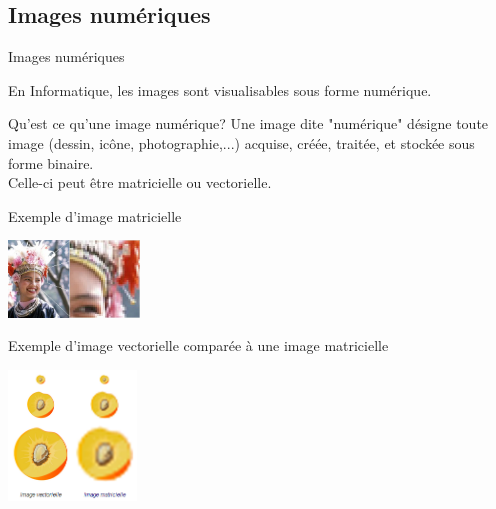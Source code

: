 \documentclass[french]{beamer}
\begin{document}
        \subsection{Images numériques}
            \begin{frame}{Images numériques}
                \tableofcontents[sectionstyle=show/hide,subsectionstyle=show/shaded/hide]
            \end{frame}
            \begin{frame}
                En Informatique, les images sont visualisables sous forme numérique.
                \begin{block}{Qu'est ce qu'une image numérique?}
                        Une image dite "numérique" désigne toute image (dessin, icône, photographie,...) acquise, créée, traitée, et stockée sous forme binaire.\\
                        Celle-ci peut être matricielle ou vectorielle.\\
                \end{block}
            \end{frame}
            \begin{frame}
                \begin{exampleblock}{Exemple d'image matricielle}
                    \begin{center}
                        \includegraphics[width=3.5cm]{Image_matricielle.jpg}
	                \end{center}
            	\end{exampleblock}
            	\begin{exampleblock}{Exemple d'image vectorielle comparée à une image matricielle}
                    \begin{center}
	                    \includegraphics[width=3.4cm]{img_vectimg_matr.png}
	                \end{center}
            	\end{exampleblock}
            \end{frame}
\end{document}

